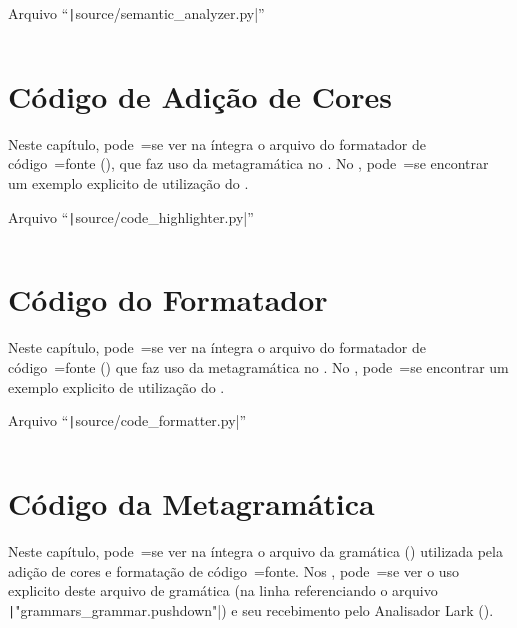 \begin{code}
\caption[Arquivo ``source/semantic\_analyzer.py'']{Arquivo ``\texttt|source/semantic_analyzer.py|''}
\label{code:semanticAnalyzerPy}
\inputminted[firstline=39,firstnumber=1]{python3}{../source/semantic_analyzer.py}
\end{code}


\chapter{Código de Adição de Cores}

Neste capítulo,
pode~=se ver na íntegra o arquivo do formatador de código~=fonte (),
que faz uso da metagramática no .
No ,
pode~=se encontrar um exemplo explicito de utilização do .
\begin{code}
\caption[Arquivo ``source/code\_highlighter.py'']{Arquivo ``\texttt|source/code_highlighter.py|''}
\label{code:codeHighlighterPy}
\inputminted[firstline=39,firstnumber=1]{python3}{../source/code_highlighter.py}
\end{code}


\chapter{Código do Formatador}
\label{chapter:codigoDoFormatador}

Neste capítulo,
pode~=se ver na íntegra o arquivo do formatador de código~=fonte () que faz uso da metagramática no .
No ,
pode~=se encontrar um exemplo explicito de utilização do .
\begin{code}
\caption[Arquivo ``source/code\_formatter.py'']{Arquivo ``\texttt|source/code_formatter.py|''}
\label{code:codeFormatterPy}
\inputminted[firstline=39,firstnumber=1]{python3}{../source/code_formatter.py}
\end{code}


\chapter{Código da Metagramática}
\label{chapter:codigoDaMetagramatica}

Neste capítulo,
pode~=se ver na íntegra o arquivo da gramática () utilizada pela adição de cores e
formatação de código~=fonte.
Nos ,
pode~=se ver o uso explicito deste arquivo de gramática (na linha referenciando o arquivo \texttt|"grammars_grammar.pushdown"|) e
seu recebimento pelo Analisador Lark ().

